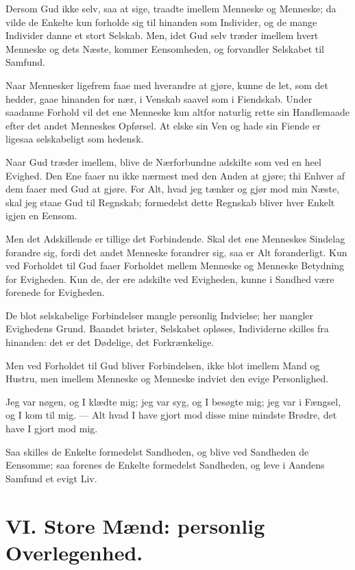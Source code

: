 \documentclass[12pt,a4paper]{book}
\newcommand{\apage}[1]{\marginnote{\footnotesize\textit{[#1]}}}
\begin{document}
Dersom Gud ikke selv, saa at sige, traadte imellem Menneske og Menneske; da vilde de Enkelte kun forholde sig til hinanden som Individer, og de mange Individer danne et stort Selskab. Men, idet Gud selv træder imellem hvert Menneske og dets Næste, kommer Eensomheden, og forvandler Selskabet til Samfund.

Naar Mennesker ligefrem faae med hverandre at gjøre, kunne de let, som det hedder, gaae hinanden for nær, i Venskab saavel som i Fiendskab. Under saadanne Forhold vil det ene Menneske kun altfor naturlig rette sin Handlemaade efter det andet Menneskes Opførsel. At elske sin Ven og hade sin Fiende er ligesaa selskabeligt som hedensk.

Naar Gud træder imellem, blive de Nærforbundne adskilte som ved en heel Evighed. Den Ene faaer nu ikke nærmest med den Anden at gjøre; thi Enhver af dem faaer med Gud at gjøre. For Alt, hvad jeg tænker og gjør mod min Næste, skal jeg staae Gud til Regnskab; formedelst dette Regnskab bliver hver Enkelt igjen en Eensom.

Men det Adskillende er tillige det Forbindende. Skal det ene Menneskes Sindelag forandre sig, fordi det andet Menneske forandrer sig, saa er Alt foranderligt. Kun ved Forholdet til Gud faaer Forholdet mellem Menneske og Menneske Betydning for Evigheden. Kun de, der ere adskilte ved Evigheden, kunne i Sandhed være forenede for Evigheden.

De blot selskabelige Forbindelser mangle personlig Indvielse; her mangler Evighedens Grund. Baandet brister, Selskabet opløses, Individerne skilles fra hinanden: det er det Dødelige, det Forkrænkelige.
 \apage{54}

Men ved Forholdet til Gud bliver Forbindelsen, ikke blot imellem Mand og Hustru, men imellem Menneske og Menneske indviet den evige Personlighed.

Jeg var nøgen, og I klædte mig; jeg var syg, og I besøgte mig; jeg var i Fængsel, og I kom til mig. --- Alt hvad I have gjort mod disse mine mindste Brødre, det have I gjort mod mig.

Saa skilles de Enkelte formedelst Sandheden, og blive ved Sandheden de Eensomme; saa forenes de Enkelte formedelst Sandheden, og leve i Aandens Samfund et evigt Liv.

\chapter*{VI. Store Mænd: personlig Overlegenhed.}
\label{ch:forel6} \apage{55}
\end{document}
